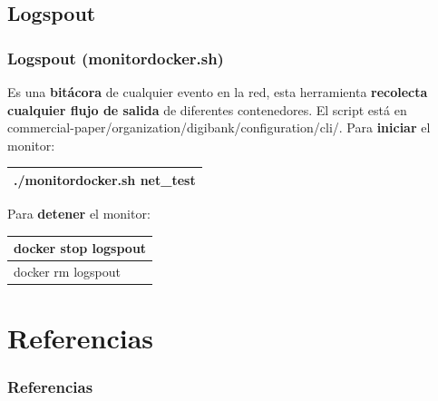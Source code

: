 \documentclass{beamer}
\begin{document}
	\subsection{Logspout}
	
	\begin{frame}
		\frametitle{Logspout (monitordocker.sh)}
		Es una \textbf{bitácora} de cualquier evento en la red, esta herramienta \textbf{recolecta cualquier flujo de salida} de diferentes contenedores. El script está en commercial-paper/organization/digibank/configuration/cli/. Para \textbf{iniciar} el monitor:\\
		\begin{center}
			\begin{tabulary}{\linewidth}{L}
				\hline
				./monitordocker.sh net\_test \\
				\hline
			\end{tabulary} 
		\end{center}
		Para \textbf{detener} el monitor:
		\begin{center}
			\begin{tabulary}{\linewidth}{L}
				\hline
				docker stop logspout \\
				\hline 
				docker rm logspout \\
				\hline
			\end{tabulary} 
		\end{center}
	\end{frame}
	
	\section{Referencias}
	
	\begin{frame} [allowframebreaks]
		\frametitle{Referencias}
		\nocite{hyper, docker, raft}
		
		
	\end{frame}
\end{document}

